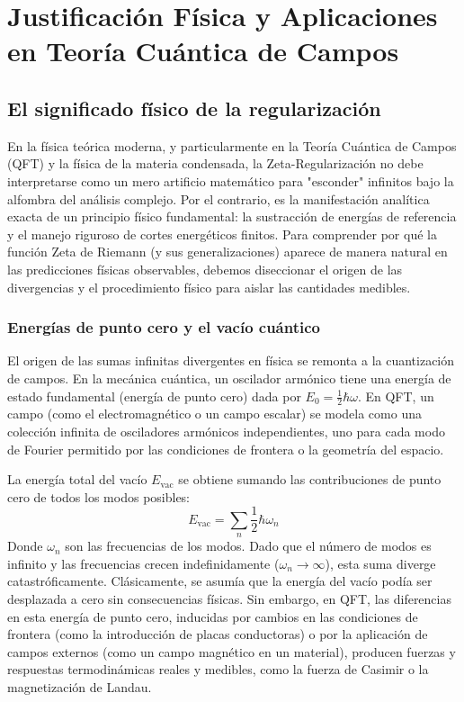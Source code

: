 \chapter{Justificación Física y Aplicaciones en Teoría Cuántica de Campos}

\section{El significado físico de la regularización}

En la física teórica moderna, y particularmente en la Teoría Cuántica de Campos (QFT) y la física de la materia condensada, la Zeta-Regularización no debe interpretarse como un mero artificio matemático para "esconder" infinitos bajo la alfombra del análisis complejo. Por el contrario, es la manifestación analítica exacta de un principio físico fundamental: la sustracción de energías de referencia y el manejo riguroso de cortes energéticos finitos. Para comprender por qué la función Zeta de Riemann (y sus generalizaciones) aparece de manera natural en las predicciones físicas observables, debemos diseccionar el origen de las divergencias y el procedimiento físico para aislar las cantidades medibles.

\subsection{Energías de punto cero y el vacío cuántico}

El origen de las sumas infinitas divergentes en física se remonta a la cuantización de campos. En la mecánica cuántica, un oscilador armónico tiene una energía de estado fundamental (energía de punto cero) dada por $E_0 = \frac{1}{2}\hbar\omega$. En QFT, un campo (como el electromagnético o un campo escalar) se modela como una colección infinita de osciladores armónicos independientes, uno para cada modo de Fourier permitido por las condiciones de frontera o la geometría del espacio.

La energía total del vacío $E_{\text{vac}}$ se obtiene sumando las contribuciones de punto cero de todos los modos posibles:
$$ E_{\text{vac}} = \sum_{n} \frac{1}{2} \hbar \omega_n $$
Donde $\omega_n$ son las frecuencias de los modos. Dado que el número de modos es infinito y las frecuencias crecen indefinidamente ($\omega_n \to \infty$), esta suma diverge catastróficamente. Clásicamente, se asumía que la energía del vacío podía ser desplazada a cero sin consecuencias físicas. Sin embargo, en QFT, las diferencias en esta energía de punto cero, inducidas por cambios en las condiciones de frontera (como la introducción de placas conductoras) o por la aplicación de campos externos (como un campo magnético en un material), producen fuerzas y respuestas termodinámicas reales y medibles, como la fuerza de Casimir o la magnetización de Landau.

